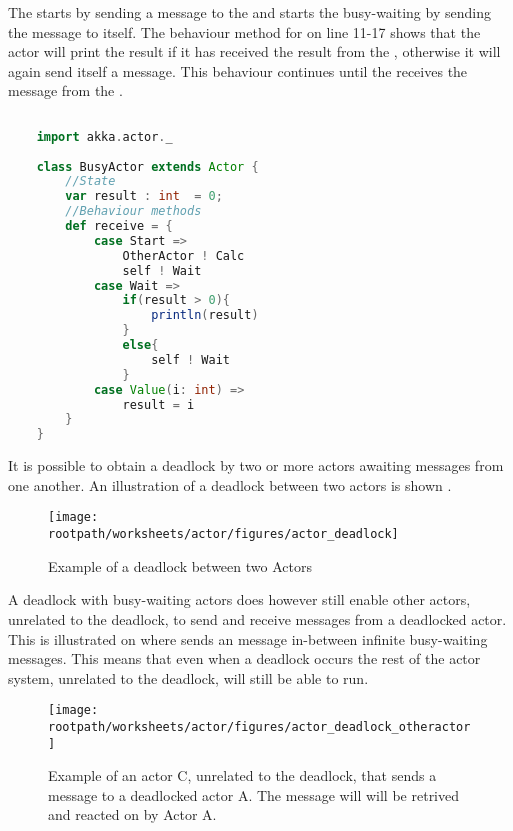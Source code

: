 The  starts by sending a message to the  and starts the busy-waiting by sending the  message to itself. The behaviour method for  on line 11-17 shows that the actor will print the result if it has received the result from the , otherwise it will again send itself a  message. This behaviour continues until the  receives the  message from the . 

\begin{lstlisting}[label=lst:actor_busywait,
  caption={Busy-waiting actor program written in the Scala Akka actor framework.},
  language=Scala,  
  showspaces=false,
  showtabs=false,
  breaklines=true,
  showstringspaces=false,
  breakatwhitespace=true,
  commentstyle=\color{greencomments},
  keywordstyle=\color{bluekeywords},
  stringstyle=\color{redstrings}]  % Start your code-block
	
	import akka.actor._
	
	class BusyActor extends Actor {
		//State
		var result : int  = 0;
		//Behaviour methods
		def receive = {
			case Start =>
				OtherActor ! Calc
				self ! Wait
			case Wait =>
				if(result > 0){
					println(result)
				}
				else{
					self ! Wait
				}	
			case Value(i: int) =>
				result = i
		}
	}
\end{lstlisting}
It is possible to obtain a deadlock by two or more actors awaiting messages from one another. An illustration of a deadlock between two actors is shown .

\begin{figure}[ht!]
\centering
\texttt{[image: \\rootpath/worksheets/actor/figures/actor\_deadlock]}
\caption{Example of a deadlock between two Actors}\label{fig:actor_deadlock}
\end{figure}

A deadlock with busy-waiting actors does however still enable other actors, unrelated to the deadlock, to send and receive messages from a deadlocked actor. This is illustrated on  where  sends an  message in-between  infinite busy-waiting messages. This means that even when a deadlock occurs the rest of the actor system, unrelated to the deadlock, will still be able to run.

\begin{figure}[ht!]
\centering
\texttt{[image: \\rootpath/worksheets/actor/figures/actor\_deadlock\_otheractor]}
\caption{Example of an actor C, unrelated to the deadlock, that sends a message to a deadlocked actor A. The message will will be retrived and reacted on by Actor A.}\label{fig:actor_deadlock_otheractor}
\end{figure}

